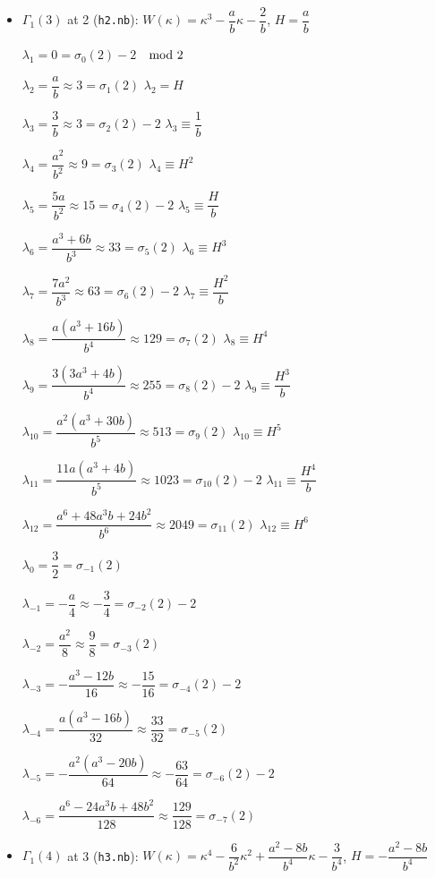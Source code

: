 \documentclass{rs}
\theoremstyle{definition}
\theoremstyle{remark}
\newcommand{\md}{~~{\rm mod}~}
\newcommand{\G}{\Gamma}
\newcommand{\K}{\kappa}
\renewcommand{\l}{\lambda}
\newcommand{\si}{\sigma}
\renewcommand{\=}{\approx}
\renewcommand{\-}{\sim}
\numberwithin{equation}{section}
\numberwithin{thm}{section}
\begin{document}
\begin{itemize}
 \item $\G_1(3)$ at 2 (\texttt{h2.nb}): $W(\K) = \K^3 - \dfrac{a}{b} \K - \dfrac{2}{b}$, \quad $H = \dfrac{a}{b}$ 

 $\l_1 = 0 = \si_0(2) - 2$ \hfill $\md 2$

 $\l_2 = \dfrac{a}{b} \= 3 = \si_1(2)$ \hfill $\l_2 = H$ 

 $\l_3 = \dfrac{3}{b} \= 3 = \si_2(2) - 2$ \hfill $\l_3 \equiv \dfrac{1}{b}$ 

 $\l_4 = \dfrac{a^2}{b^2} \= 9 = \si_3(2)$ \hfill $\l_4 \equiv H^2$ 

 $\l_5 = \dfrac{5 a}{b^2} \= 15 = \si_4(2) - 2$ \hfill $\l_5 \equiv \dfrac{H}{b}$ 

 $\l_6 = \dfrac{a^3 + 6 b}{b^3} \= 33 = \si_5(2)$ \hfill $\l_6 \equiv H^3$ 

 $\l_7 = \dfrac{7 a^2}{b^3} \= 63 = \si_6(2) - 2$ \hfill $\l_7 \equiv \dfrac{H^2}{b}$ 

 $\l_8 = \dfrac{a (a^3 + 16 b)}{b^4} \= 129 = \si_7(2)$ \hfill $\l_8 \equiv H^4$ 

 $\l_9 = \dfrac{3 (3 a^3 + 4 b)}{b^4} \= 255 = \si_8(2) - 2$ \hfill $\l_9 \equiv \dfrac{H^3}{b}$ 

 $\l_{10} = \dfrac{a^2 (a^3 + 30 b)}{b^5} \= 513 = \si_9(2)$ \hfill $\l_{10} \equiv H^5$ 

 $\l_{11} = \dfrac{11 a (a^3 + 4 b)}{b^5} \= 1023 = \si_{10}(2) - 2$ \hfill $\l_{11} \equiv \dfrac{H^4}{b}$ 

 $\l_{12} = \dfrac{a^6 + 48 a^3 b + 24 b^2}{b^6} \= 2049 = \si_{11}(2)$ \hfill $\l_{12} \equiv H^6$ 

 $\l_0 = \dfrac{3}{2} = \si_{-1}(2)$ 

 $\l_{-1} = -\dfrac{a}{4} \= -\dfrac{3}{4} = \si_{-2}(2) - 2$ 

 $\l_{-2} = \dfrac{a^2}{8} \= \dfrac{9}{8} = \si_{-3}(2)$ 

 $\l_{-3} = -\dfrac{a^3 - 12 b}{16} \= -\dfrac{15}{16} = \si_{-4}(2) - 2$ 

 $\l_{-4} = \dfrac{a (a^3 - 16 b)}{32} \= \dfrac{33}{32} = \si_{-5}(2)$ 

 $\l_{-5} = -\dfrac{a^2 (a^3 - 20 b)}{64} \= -\dfrac{63}{64} = \si_{-6}(2) - 2$ 

 $\l_{-6} = \dfrac{a^6 - 24 a^3 b + 48 b^2}{128} \= \dfrac{129}{128} = \si_{-7}(2)$ 

 \item $\G_1(4)$ at 3 (\texttt{h3.nb}): $W(\K) = \K^4 - \dfrac{6}{b^2} \K^2 + \dfrac{a^2 - 8 b}{b^4} \K - \dfrac{3}{b^4}$, \quad $H = -\dfrac{a^2 - 8 b}{b^4}$ 


\end{itemize}
\end{document}
